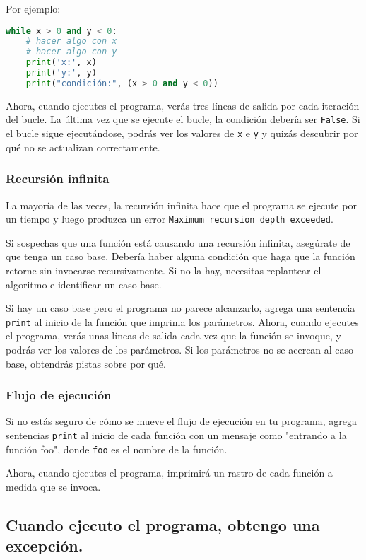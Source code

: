 Por ejemplo:

\begin{lstlisting}[language=Python]
while x > 0 and y < 0:
    # hacer algo con x
    # hacer algo con y
    print('x:', x)
    print('y:', y)
    print("condición:", (x > 0 and y < 0))
\end{lstlisting}

Ahora, cuando ejecutes el programa, verás tres líneas de salida por cada iteración del bucle. La última vez que se ejecute el bucle, la condición debería ser \texttt{False}. Si el bucle sigue ejecutándose, podrás ver los valores de \texttt{x} e \texttt{y} y quizás descubrir por qué no se actualizan correctamente.

\subsubsection{Recursión infinita}

La mayoría de las veces, la recursión infinita hace que el programa se ejecute por un tiempo y luego produzca un error \texttt{Maximum recursion depth exceeded}.

Si sospechas que una función está causando una recursión infinita, asegúrate de que tenga un caso base. Debería haber alguna condición que haga que la función retorne sin invocarse recursivamente. Si no la hay, necesitas replantear el algoritmo e identificar un caso base.

Si hay un caso base pero el programa no parece alcanzarlo, agrega una sentencia \texttt{print} al inicio de la función que imprima los parámetros. Ahora, cuando ejecutes el programa, verás unas líneas de salida cada vez que la función se invoque, y podrás ver los valores de los parámetros. Si los parámetros no se acercan al caso base, obtendrás pistas sobre por qué.

\subsubsection{Flujo de ejecución}

Si no estás seguro de cómo se mueve el flujo de ejecución en tu programa, agrega sentencias \texttt{print} al inicio de cada función con un mensaje como "entrando a la función foo", donde \texttt{foo} es el nombre de la función.

Ahora, cuando ejecutes el programa, imprimirá un rastro de cada función a medida que se invoca.

\subsection{Cuando ejecuto el programa, obtengo una excepción.}

